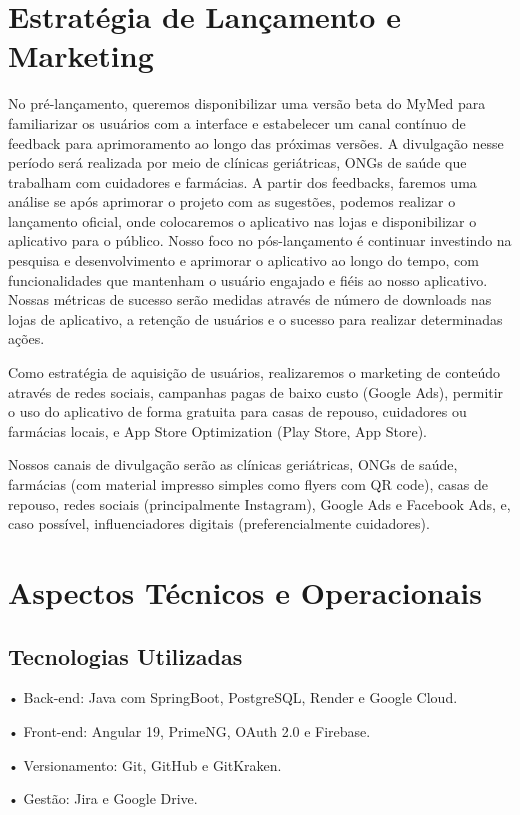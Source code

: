 \section{Estratégia de Lançamento e Marketing}
No pré-lançamento, queremos disponibilizar uma versão beta do MyMed para familiarizar os usuários com a interface e estabelecer um canal contínuo de feedback para aprimoramento ao longo das próximas versões. A divulgação nesse período será realizada por meio de clínicas geriátricas, ONGs de saúde que trabalham com cuidadores e farmácias. A partir dos feedbacks, faremos uma análise se após aprimorar o projeto com as sugestões, podemos realizar o lançamento oficial, onde colocaremos o aplicativo nas lojas e disponibilizar o aplicativo para o público. Nosso foco no pós-lançamento é continuar investindo na pesquisa e desenvolvimento e aprimorar o aplicativo ao longo do tempo, com funcionalidades que mantenham o usuário engajado e fiéis ao nosso aplicativo. Nossas métricas de sucesso serão medidas através de número de downloads nas lojas de aplicativo, a retenção de usuários e o sucesso para realizar determinadas ações. 

Como estratégia de aquisição de usuários, realizaremos o marketing de conteúdo através de redes sociais, campanhas pagas de baixo custo (Google Ads), permitir o uso do aplicativo de forma gratuita para casas de repouso, cuidadores ou farmácias locais, e App Store Optimization (Play Store, App Store).

Nossos canais de divulgação serão as clínicas geriátricas, ONGs de saúde, farmácias (com material impresso simples como flyers com QR code), casas de repouso, redes sociais (principalmente Instagram), Google Ads e Facebook Ads, e, caso possível, influenciadores digitais (preferencialmente cuidadores).

\section{Aspectos Técnicos e Operacionais}

\subsection*{Tecnologias Utilizadas}
• Back-end: Java com SpringBoot, PostgreSQL, Render e Google Cloud.

• Front-end: Angular 19, PrimeNG, OAuth 2.0 e Firebase.

• Versionamento: Git, GitHub e GitKraken.

• Gestão: Jira e Google Drive.

